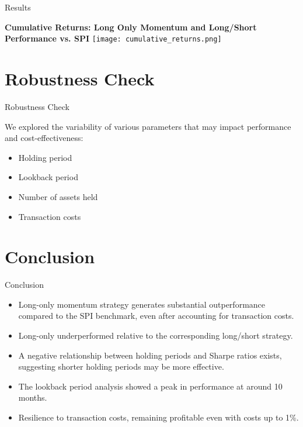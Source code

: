 \documentclass[10pt]{beamer}
\begin{document}
\begin{frame}{Results}
    \begin{center}
        {\footnotesize \textbf{Cumulative Returns: Long Only Momentum and Long/Short Performance vs. SPI}}
        \vspace{0.5cm} %
        \texttt{[image: cumulative\_returns.png]}
    \end{center}
\end{frame}

\section{Robustness Check}
\begin{frame}{Robustness Check}

We explored the variability of various parameters that may impact performance and cost-effectiveness:

\begin{itemize}
    \item Holding period
    \item Lookback period
    \item Number of assets held
    \item Transaction costs    
\end{itemize}
\end{frame}


\section{Conclusion}
\begin{frame}{Conclusion}

\begin{itemize}
    \item Long-only momentum strategy generates substantial outperformance compared to the SPI benchmark, even after accounting for transaction costs.
    \item Long-only underperformed relative to the corresponding long/short strategy.
    \item A negative relationship between holding periods and Sharpe ratios exists, suggesting shorter holding periods may be more effective.
    \item The lookback period analysis showed a peak in performance at around 10 months. 
    \item Resilience to transaction costs, remaining profitable even with costs up to 1\%.      
\end{itemize}
\end{frame}
\end{document}
